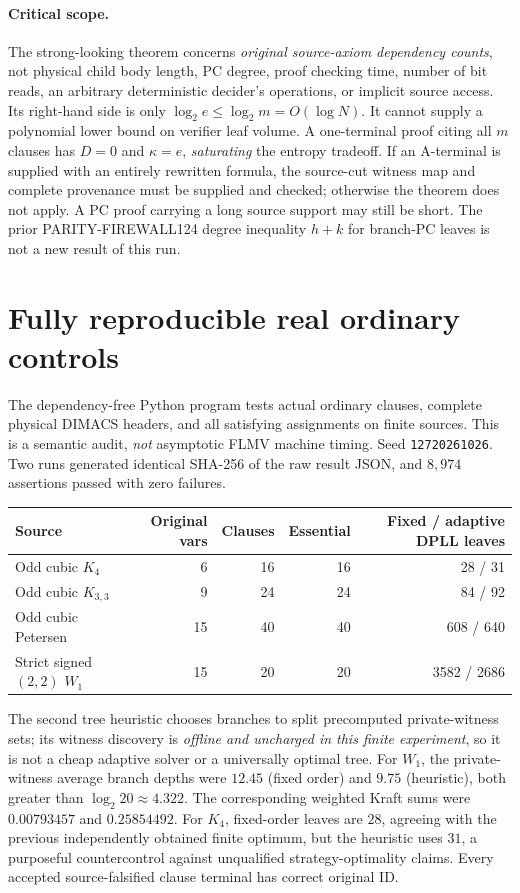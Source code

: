 \documentclass[11pt]{article}
\begin{document}
\paragraph{Critical scope.}
The strong-looking theorem concerns \emph{original source-axiom
dependency counts}, not physical child body length, PC degree,
proof checking time, number of bit reads, an arbitrary deterministic
decider's operations, or implicit source access. Its right-hand
side is only $\log_2 e\le\log_2m=O(\log N)$. It cannot supply
a polynomial lower bound on verifier leaf volume. A one-terminal
proof citing all $m$ clauses has $D=0$ and
$\kappa=e$, \emph{saturating} the entropy tradeoff.
If an A-terminal is supplied with an entirely rewritten formula,
the source-cut witness map and complete provenance must be supplied
and checked; otherwise the theorem does not apply. A PC proof
carrying a long source support may still be short. The prior
PARITY-FIREWALL124 degree inequality $h+k$ for branch-PC leaves is
not a new result of this run.

\section{Fully reproducible real ordinary controls}
The dependency-free Python program tests actual ordinary clauses,
complete physical DIMACS headers, and all satisfying assignments
on finite sources. This is a semantic audit, \emph{not} asymptotic
FLMV machine timing. Seed \texttt{12720261026}. Two runs generated
identical SHA-256 of the raw result JSON, and $8,974$ assertions
passed with zero failures.

\begin{center}
\begin{tabular}{lrrrr}
\toprule
Source&Original vars&Clauses&Essential&Fixed / adaptive DPLL leaves\\
\midrule
Odd cubic $K_4$&6&16&16&28 / 31\\
Odd cubic $K_{3,3}$&9&24&24&84 / 92\\
Odd cubic Petersen&15&40&40&608 / 640\\
Strict signed $(2,2)$ $W_1$&15&20&20&3582 / 2686\\
\bottomrule
\end{tabular}
\end{center}
The second tree heuristic chooses branches to split precomputed
private-witness sets; its witness discovery is \emph{offline
and uncharged in this finite experiment}, so it is not a cheap
adaptive solver or a universally optimal tree.
For $W_1$, the private-witness average branch depths were
$12.45$ (fixed order) and $9.75$ (heuristic), both greater
than $\log_2 20\approx4.322$. The corresponding weighted
Kraft sums were $0.00793457$ and $0.25854492$.
For $K_4$, fixed-order leaves are $28$, agreeing with the
previous independently obtained finite optimum, but the
heuristic uses $31$, a purposeful countercontrol against
unqualified strategy-optimality claims. Every accepted
source-falsified clause terminal has correct original ID.
\end{document}
